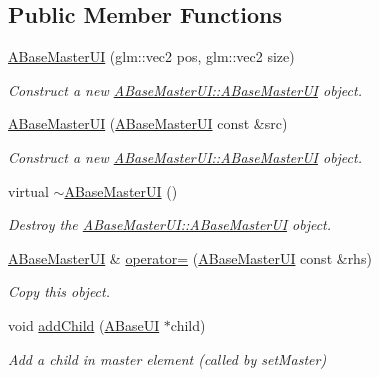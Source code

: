 \subsection*{Public Member Functions}
\begin{DoxyCompactItemize}
\item 
\hyperlink{class_a_base_master_u_i_a311ce7af9ba882f3a274f6887c2196dc}{A\+Base\+Master\+UI} (glm\+::vec2 pos, glm\+::vec2 size)
\begin{DoxyCompactList}\small\item\em Construct a new \hyperlink{class_a_base_master_u_i_a311ce7af9ba882f3a274f6887c2196dc}{A\+Base\+Master\+U\+I\+::\+A\+Base\+Master\+UI} object. \end{DoxyCompactList}\item 
\hyperlink{class_a_base_master_u_i_aca816b5bc0624de287a3d386215a4c71}{A\+Base\+Master\+UI} (\hyperlink{class_a_base_master_u_i}{A\+Base\+Master\+UI} const \&src)
\begin{DoxyCompactList}\small\item\em Construct a new \hyperlink{class_a_base_master_u_i_a311ce7af9ba882f3a274f6887c2196dc}{A\+Base\+Master\+U\+I\+::\+A\+Base\+Master\+UI} object. \end{DoxyCompactList}\item 
\mbox{\label{class_a_base_master_u_i_a4714109951994c3f140add1f4effbcfb}} 
virtual \hyperlink{class_a_base_master_u_i_a4714109951994c3f140add1f4effbcfb}{$\sim$\+A\+Base\+Master\+UI} ()
\begin{DoxyCompactList}\small\item\em Destroy the \hyperlink{class_a_base_master_u_i_a311ce7af9ba882f3a274f6887c2196dc}{A\+Base\+Master\+U\+I\+::\+A\+Base\+Master\+UI} object. \end{DoxyCompactList}\item 
\hyperlink{class_a_base_master_u_i}{A\+Base\+Master\+UI} \& \hyperlink{class_a_base_master_u_i_a2023324b8f6cd85877c7932d5c46276f}{operator=} (\hyperlink{class_a_base_master_u_i}{A\+Base\+Master\+UI} const \&rhs)
\begin{DoxyCompactList}\small\item\em Copy this object. \end{DoxyCompactList}\item 
void \hyperlink{class_a_base_master_u_i_ae6bcaed259182e299cdfc6fabc8e01f1}{add\+Child} (\hyperlink{class_a_base_u_i}{A\+Base\+UI} $\ast$child)
\begin{DoxyCompactList}\small\item\em Add a child in master element (called by set\+Master) \end{DoxyCompactList}\item 

\end{DoxyCompactItemize}
